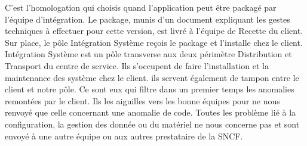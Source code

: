     C'est l'homologation qui choisis quand l'application peut être packagé par l'équipe d'intégration. Le package, munis d'un document expliquant les gestes techniques à effectuer pour cette version, est livré à l'équipe de Recette du client. Sur place, le pôle Intégration Système reçois le package et l'installe chez le client. Intégration Système est un pôle transverse aux deux périmètre Distribution et Transport du centre de service. Ils s'occupent de faire l'installation et la maintenance des système chez le client. ils servent également de tampon entre le client et notre pôle. Ce sont eux qui filtre dans un premier temps les anomalies remontées par le client. Ils les aiguilles vers les bonne équipes pour ne nous renvoyé que celle concernant une anomalie de code. Toutes les problème lié à la configuration, la gestion des donnée ou du matériel ne nous concerne pas et sont envoyé à une autre équipe ou aux autres prestataire de la SNCF.